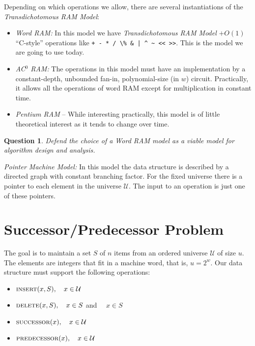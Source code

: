 \documentclass[11pt]{article}
\newcommand{\proc}[1]{\textnormal{\scshape#1}}
\newtheorem{question}{Question}
\newcommand{\U}{\mathcal{U}}
\begin{document}
Depending on which operations we allow, there are several instantiations
of the {\em Transdichotomous RAM Model}:

\begin{itemize}

\item {\em Word RAM: } In this model we have {\em Transdichotomous RAM Model} $ + O(1)$ ``C-style'' operations like \verb!+ - * / \% & | ^ ~ << >>!. This is the model we are going to use today. 

\item {\em AC$^0$ RAM: } The operations in this model must have an implementation by a constant-depth, unbounded fan-in, polynomial-size (in $w$)
  circuit. Practically, it allows all the operations of word
  RAM except for multiplication in constant time.

\item {\em Pentium RAM} -- While interesting practically, this model
  is of little theoretical interest as it tends to change over time.
\end{itemize}

\begin{question}
Defend the choice of a Word RAM model as a viable model for algorithm design and analysis.
\end{question}

{\em Pointer Machine Model: }  In this model the data structure is described by a directed graph with constant branching factor. For the fixed universe there is a pointer to each element in the universe $\U$. The input to an operation is just one of these pointers.


\section{Successor/Predecessor Problem}

The goal is to maintain a set $S$ of $n$ items from an ordered universe $\U$ of size $u$. The elements are integers that fit in a machine word, that is, $u = 2^w$. Our data structure must support the following operations:

\begin{itemize}

\item $\proc{insert}(x, S),\quad x \in \U$

\item $\proc{delete}(x, S),\quad x \in S$ and $\quad x \in S$

\item $\proc{successor}(x),\quad x \in \U$

\item $\proc{predecessor}(x),\quad x \in \U$

\end{itemize}
\end{document}
